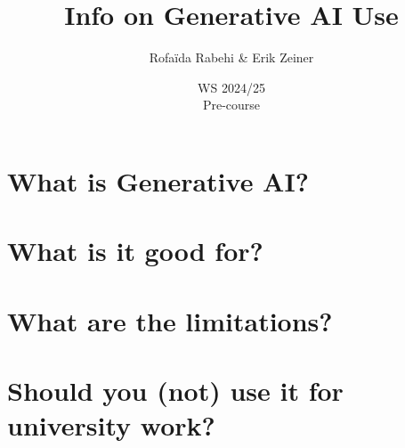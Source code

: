 \documentclass[aspectratio=169,hyperref={unicode}]{beamer}
\title{Info on Generative AI Use}
\author{Rofaïda Rabehi \& Erik Zeiner}
\institute{Fachschaft General \& Computational Linguistics\\ \textbf{University of Tübingen}}
\date{WS 2024/25 \\ Pre-course}
\begin{document}
\frame{\titlepage}



\section{What is Generative AI?}

\section{What is it good for?}

\section{What are the limitations?}

\section{Should you (not) use it for university work?}
\end{document}
